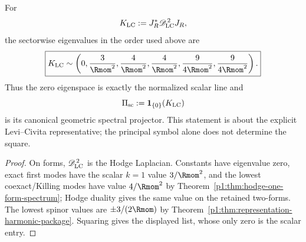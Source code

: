 \documentclass[11pt]{article}
\begin{document}
\begin{corollary}
\label{p1:cor:canonical-retained-dirac-square}
For
\[
 K_{\rm LC}:=J_R^*\mathscr D_{\rm LC}^{\,2}J_R,
\]
the sectorwise eigenvalues in the order used above are
\[
 \boxed{
 K_{\rm LC}\sim
 \left(0,\frac3{\Rmom^2},\frac4{\Rmom^2},
 \frac4{\Rmom^2},\frac9{4\Rmom^2},\frac9{4\Rmom^2}\right).}
\]
Thus the zero eigenspace is exactly the normalized scalar line and
\[
 \Pi_{\rm sc}:=\mathbf1_{\{0\}}(K_{\rm LC})
\]
is its canonical geometric spectral projector.  This statement is about the
explicit Levi--Civita representative; the principal symbol alone does not
determine the square.
\end{corollary}

\begin{proof}
On forms, \(\mathscr D_{\rm LC}^{\,2}\) is the Hodge Laplacian.  Constants
have eigenvalue zero, exact first modes have the scalar \(k=1\) value
\(3/\Rmom^2\), and the lowest coexact/Killing modes have value
\(4/\Rmom^2\) by Theorem~\ref{p1:thm:hodge-one-form-spectrum}; Hodge duality
gives the same value on the retained two-forms.  The lowest spinor values are
\(\pm3/(2\Rmom)\) by
Theorem~\ref{p1:thm:representation-harmonic-package}.  Squaring gives the
displayed list, whose only zero is the scalar entry.
\end{proof}
\end{document}
